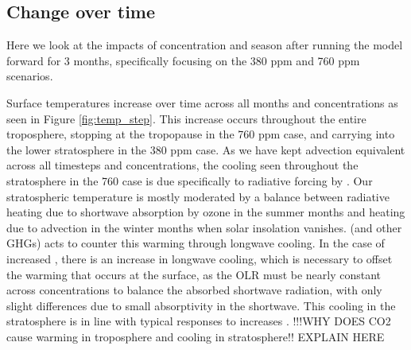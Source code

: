\documentclass[12]{article}
\begin{document}
\subsection{Change over time}
Here we look at the impacts of  concentration and season after running the model forward for 3 months, specifically focusing on the 380 ppm and 760 ppm scenarios. 

Surface temperatures increase over time across all months and  concentrations as seen in Figure \ref{fig:temp_step}. This increase occurs throughout the entire troposphere, stopping at the tropopause in the 760 ppm case, and carrying into the lower stratosphere in the 380 ppm case. As we have kept advection equivalent across all timesteps and  concentrations, the cooling seen throughout the stratosphere in the 760 case is due specifically to radiative forcing by . Our stratospheric temperature is mostly moderated by a balance between radiative heating due to shortwave absorption by ozone in the summer months and heating due to advection in the winter months when solar insolation vanishes.  (and other GHGs) acts to counter this warming through longwave cooling. In the case of increased , there is an increase in longwave cooling, which is necessary to offset the warming that occurs at the surface, as the OLR must be nearly constant across  concentrations to balance the absorbed shortwave radiation, with only slight differences due to small  absorptivity in the shortwave. This cooling in the stratosphere is in line with typical responses to  increases \citep{rind_climate_1989, fels_stratospheric_1980}. !!!WHY DOES CO2 cause warming in troposphere and cooling in stratosphere!! EXPLAIN HERE
\end{document}
